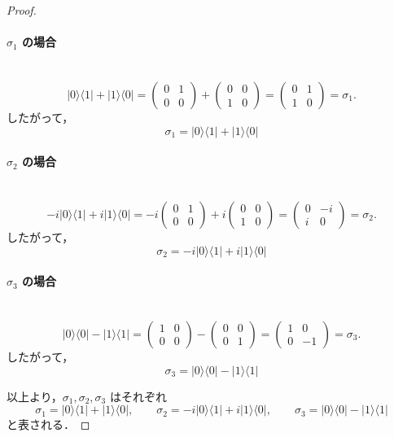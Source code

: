 \documentclass[dvipdfmx,a4paper]{jsarticle}
\theoremstyle{mystyle}
\begin{document}
\begin{proof}
\paragraph{\textbf{$\sigma_1$ の場合}} \ \\
\[
|0\rangle\langle 1|+|1\rangle\langle 0|
=
\begin{pmatrix}
0 & 1\\
0 & 0
\end{pmatrix}
+
\begin{pmatrix}
0 & 0\\
1 & 0
\end{pmatrix}
=
\begin{pmatrix}
0 & 1\\
1 & 0
\end{pmatrix}
=
\sigma_1.
\]
したがって，
\[
\sigma_1=|0\rangle\langle 1|+|1\rangle\langle 0|
\]

\paragraph{\textbf{$\sigma_2$ の場合}} \ \\
\[
-i|0\rangle\langle 1|+i|1\rangle\langle 0|
=
-i
\begin{pmatrix}
0 & 1\\
0 & 0
\end{pmatrix}
+i
\begin{pmatrix}
0 & 0\\
1 & 0
\end{pmatrix}
=
\begin{pmatrix}
0 & -i\\
i & 0
\end{pmatrix}
=
\sigma_2.
\]
したがって，
\[
\sigma_2=-i|0\rangle\langle 1|+i|1\rangle\langle 0|
\]

\paragraph{\textbf{$\sigma_3$ の場合}} \ \\
\[
|0\rangle\langle 0|-|1\rangle\langle 1|
=
\begin{pmatrix}
1 & 0\\
0 & 0
\end{pmatrix}
-
\begin{pmatrix}
0 & 0\\
0 & 1
\end{pmatrix}
=
\begin{pmatrix}
1 & 0\\
0 & -1
\end{pmatrix}
=
\sigma_3.
\]
したがって，
\[
\sigma_3=|0\rangle\langle 0|-|1\rangle\langle 1|
\]

\medskip
\noindent
以上より，$\sigma_1,\sigma_2,\sigma_3$ はそれぞれ
\[
\sigma_1=|0\rangle\langle 1|+|1\rangle\langle 0|,\qquad
\sigma_2=-i|0\rangle\langle 1|+i|1\rangle\langle 0|,\qquad
\sigma_3=|0\rangle\langle 0|-|1\rangle\langle 1|
\]
と表される．
\end{proof}
\end{document}

